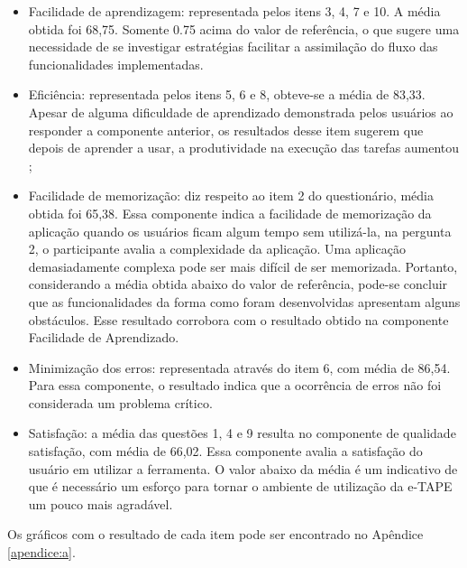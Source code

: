 \begin{itemize}
    \item Facilidade de aprendizagem: representada pelos itens 3, 4, 7 e 10. A média obtida foi 68,75. Somente 0.75 acima do valor de referência, o que sugere uma necessidade de se investigar estratégias facilitar a assimilação do fluxo das funcionalidades implementadas. 
    \item Eficiência: representada pelos itens 5, 6 e 8, obteve-se a média de 83,33. Apesar de alguma dificuldade de aprendizado demonstrada pelos usuários ao responder a componente anterior, os resultados desse item sugerem que depois de aprender a usar, a produtividade na execução das tarefas aumentou ;
    \item Facilidade de memorização: diz respeito ao item 2 do questionário, média obtida foi 65,38. Essa componente indica a facilidade de memorização da aplicação quando os usuários ficam algum tempo sem utilizá-la, na pergunta 2, o participante avalia a complexidade da aplicação. Uma aplicação demasiadamente complexa pode ser mais difícil de ser memorizada. Portanto, considerando a média obtida abaixo do valor de referência, pode-se concluir que as funcionalidades da forma como foram desenvolvidas apresentam alguns obstáculos. Esse resultado corrobora com o resultado obtido na componente Facilidade de Aprendizado.
    \item Minimização dos erros: representada através do item 6, com média de 86,54. Para essa componente, o resultado indica que a ocorrência de erros não foi considerada um problema crítico. 
    \item Satisfação: a média das questões 1, 4 e 9 resulta no componente de qualidade satisfação, com média de 66,02. Essa componente avalia a satisfação do usuário em utilizar a ferramenta. O valor abaixo da média é um indicativo de que é necessário um esforço para tornar o ambiente de utilização da e-TAPE um pouco mais agradável.
\end{itemize}

\par
Os gráficos com o resultado de cada item pode ser encontrado no Apêndice \ref{apendice:a}.




